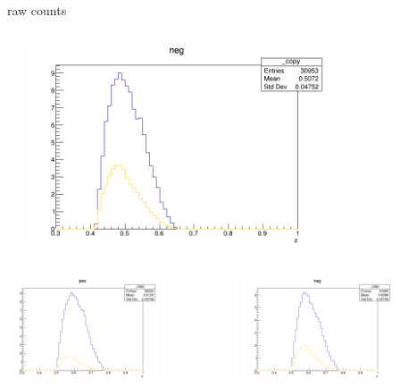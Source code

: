 \begin{frame}{raw counts}
\begin{columns}
\begin{column}[T]{0.25\textwidth}
\end{column}
\begin{column}[T]{0.25\textwidth}
\includegraphics[width = 0.7\textwidth]{results/yield/statistics/yield_x_Q2_z_0.50_5.000_0.50_neg.png}
\end{column}
\end{columns}
\begin{columns}
\begin{column}[T]{0.25\textwidth}
\includegraphics[width = 0.7\textwidth]{results/yield/statistics/yield_x_Q2_z_0.50_5.000_0.60_pos.png}
\end{column}
\begin{column}[T]{0.25\textwidth}
\includegraphics[width = 0.7\textwidth]{results/yield/statistics/yield_x_Q2_z_0.50_5.000_0.60_neg.png}

\end{column}
\end{columns}
\end{frame}
